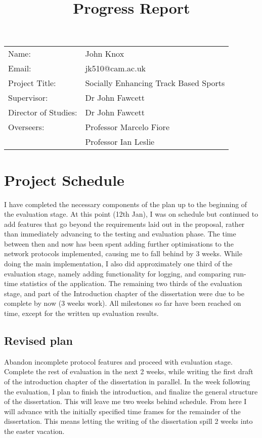 \documentclass{article}
\begin{document}
\title{\bf \huge{Progress Report}}

\maketitle

{\large
\begin{tabular}{ll}
Name:                & John Knox                             \\
Email:               & jk510@cam.ac.uk                       \\
Project Title:       & Socially Enhancing Track Based Sports \\
Supervisor:          & Dr John Fawcett                           \\
Director of Studies: & Dr John Fawcett                           \\
Overseers:           & Professor Marcelo Fiore                   \\
                     & Professor Ian Leslie                      \\
\end{tabular}
}

\normalsize
\section*{Project Schedule}

I have completed the necessary components of the plan up to the beginning of the evaluation stage.
At this point (12th Jan), I was on schedule but continued to add features that go beyond the requirements laid out in the proposal, rather than immediately advancing to the testing and evaluation phase. The time between then and now has been spent adding further optimisations to the network protocols implemented, causing me to fall behind by 3 weeks.
While doing the main implementation, I also did approximately one third of the evaluation stage, namely adding functionality for logging, and comparing run-time statistics of the application. The remaining two thirds of the evaluation stage, and part of the Introduction chapter of the dissertation were due to be complete by now (3 weeks work).
All milestones so far have been reached on time, except for the written up evaluation results.

\subsection*{Revised plan}
Abandon incomplete protocol features and proceed with evaluation stage.
Complete the rest of evaluation in the next 2 weeks, while writing the first draft of the introduction chapter of the dissertation in parallel.
In the week following the evaluation, I plan to finish the introduction, and finalize the general structure of the dissertation.
This will leave me two weeks behind schedule.
From here I will advance with the initially specified time frames for the remainder of the dissertation. This means letting the writing of the dissertation spill 2 weeks into the easter vacation.
\end{document}
